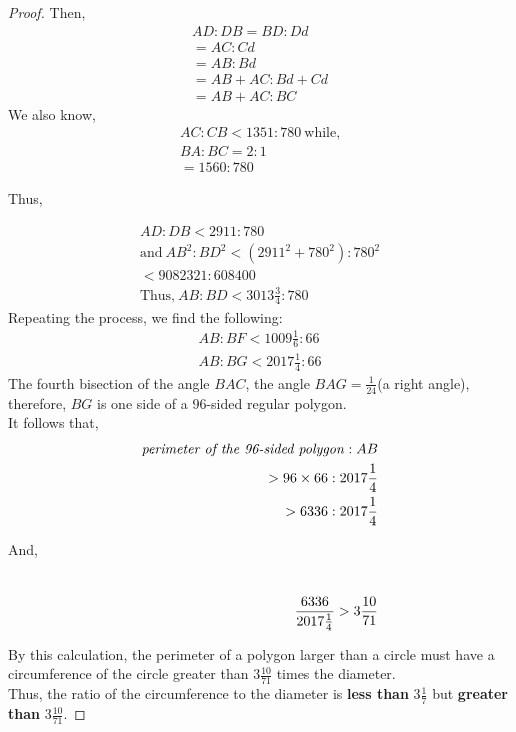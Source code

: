 \documentclass{article}
\begin{document}
\begin{proof}
    Then,
    \begin{align*}
        AD:DB = BD : Dd\\
        =AC: Cd\\
        =AB: Bd\\
        =AB+AC:Bd+Cd\\
        =AB+AC:BC
    \end{align*}
    We also know,
    \begin{align*}
        AC:CB<1351:780 \: \text{while,}\\
        BA:BC = 2:1\\
        =1560:780
    \end{align*}
    \begin{center}
        Thus,
    \end{center}
    \begin{align*}
        AD:DB<2911:780\\
        \text{and} \: AB^2:BD^2 <(2911^2+780^2):780^2\\
        < 9082321: 608400\\
        \text{Thus,} \: AB:BD<3013\frac{3}{4}:780
    \end{align*}
    Repeating the process, we find the following:
    \[\begin{array}{c}
    AB:BF <1009\frac{1}{6} :66\\
    AB:BG<2017\frac{1}{4} :66
    \end{array}\]
    The fourth bisection of the angle $BAC$, the angle $BAG = \frac{1}{24}$(a right angle), therefore, $BG$ is one side of a 96-sided regular polygon. \\

    It follows that, 
    \begin{align*}
         \text{\textit{perimeter of the 96-sided polygon}}:AB\\
        > 96\times66:2017\frac{1}{4}\\
        >6336:2017\frac{1}{4}\\
    \end{align*}
    \begin{center}
        And,
    \end{center}
    \begin{align*}
        \hphantom{AB : \text{\textit{perimeter of the 96-sided polygon}}}\\
        \frac{6336}{2017\frac{1}{4}} 
        >3\frac{10}{71}  
    \end{align*}    

    By this calculation, the perimeter of a polygon larger than a circle must have a circumference of the circle greater than $3\frac{10}{71}$ times the diameter.\\

    Thus, the ratio of the circumference to the diameter is \textbf{less than} $3\frac{1}{7}$ but \textbf{greater than} $3\frac{10}{71}$. 
\end{proof}
\end{document}
